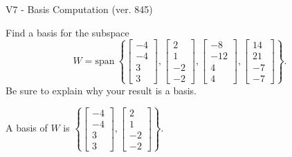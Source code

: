 \begin{exercise}
  \begin{exerciseTitle}V7 - Basis Computation (ver. 845)\end{exerciseTitle}
  \begin{exerciseStatement}
    Find a basis for the subspace 
\[W=\mathrm{span}\ \left\{\left[\begin{array}{r}
-4 \\
-4 \\
3 \\
3
\end{array}\right] , \left[\begin{array}{r}
2 \\
1 \\
-2 \\
-2
\end{array}\right] , \left[\begin{array}{r}
-8 \\
-12 \\
4 \\
4
\end{array}\right] , \left[\begin{array}{r}
14 \\
21 \\
-7 \\
-7
\end{array}\right]\right\}.\]
 Be sure to explain why your result is a basis.


  \end{exerciseStatement}
  \begin{exerciseAnswer}
   A basis of \(W\) is  \(\left\{\left[\begin{array}{r}
-4 \\
-4 \\
3 \\
3
\end{array}\right] , \left[\begin{array}{r}
2 \\
1 \\
-2 \\
-2
\end{array}\right]\right\}\).
  


  \end{exerciseAnswer}
\end{exercise}